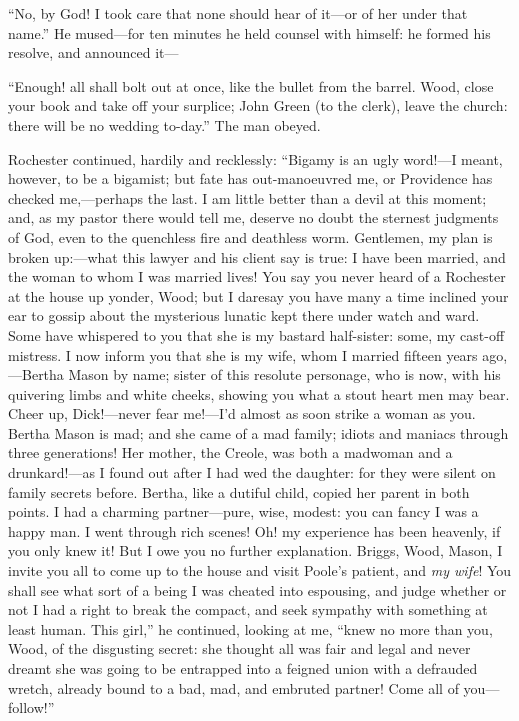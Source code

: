 \enquote{No, by God! I took care that none should hear of it---or of
	her under that name.} He mused---for ten minutes he held counsel with
himself: he formed his resolve, and announced it---

\enquote{Enough! all shall bolt out at once, like the bullet from the
	barrel. Wood, close your book and take off your surplice; John Green
	(to the clerk), leave the church: there will be no wedding to-day.} The
man obeyed.

\Mr{} Rochester continued, hardily and recklessly: \enquote{Bigamy is an ugly
	word!---I meant, however, to be a bigamist; but fate has out-manoeuvred
	me, or Providence has checked me,---perhaps the last. I am little
	better than a devil at this moment; and, as my pastor there would tell
	me, deserve no doubt the sternest judgments of God, even to the
	quenchless fire and deathless worm. Gentlemen, my plan is broken
	up:---what this lawyer and his client say is true: I have been married,
	and the woman to whom I was married lives! You say you never heard of a
	\Mrs{} Rochester at the house up yonder, Wood; but I daresay you have many
	a time inclined your ear to gossip about the mysterious lunatic kept
	there under watch and ward. Some have whispered to you that she is my
	bastard half-sister: some, my cast-off mistress. I now inform you that
	she is my wife, whom I married fifteen years ago,---Bertha Mason by
	name; sister of this resolute personage, who is now, with his quivering
	limbs and white cheeks, showing you what a stout heart men may bear.
	Cheer up, Dick!---never fear me!---I'd almost as soon strike a woman as
	you. Bertha Mason is mad; and she came of a mad family; idiots and
	maniacs through three generations! Her mother, the Creole, was both a
	madwoman and a drunkard!---as I found out after I had wed the daughter:
	for they were silent on family secrets before. Bertha, like a dutiful
	child, copied her parent in both points. I had a charming
	partner---pure, wise, modest: you can fancy I was a happy man. I went
	through rich scenes! Oh! my experience has been heavenly, if you only
	knew it! But I owe you no further explanation. Briggs, Wood, Mason, I
	invite you all to come up to the house and visit \Mrs{} Poole's patient,
	and \emph{my wife}! You shall see what sort of a being I was cheated
	into espousing, and judge whether or not I had a right to break the
	compact, and seek sympathy with something at least human. This girl,}
he continued, looking at me, \enquote{knew no more than you, Wood, of
	the disgusting secret: she thought all was fair and legal and never
	dreamt she was going to be entrapped into a feigned union with a
	defrauded wretch, already bound to a bad, mad, and embruted partner!
	Come all of you---follow!}

